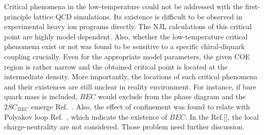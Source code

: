 \documentclass[prd, showpacs,nofootinbib,amsmath,amssymb,12pt]{revtex4}
\begin{document}
Critical phenomena in the low-temperature could not be addressed with the first-principle lattice QCD simulations.
Its existence is difficult to be observed in experimental heavy ion programs directly.
The NJL calculations of this critical point are highly model dependent.
Also, whether the low-temperature critical phenomena exist or not was found to be sensitive to a specific chiral-diquark coupling crucially\cite{}.
Even for the appropriate model parameters, the given COE region is rather narrow and the obtained critical point is located at the intermediate density\cite{abuki2010nambu}.
More importantly, the locations of such critical phenomena and their existences are still unclear in reality environment.
For instance, if bare quark mass is included, $BEC$ would exclude from the phase diagram and the $2SC_{BEC}$ emerge Ref.~\cite{basler2010role}.
Also, the effect of confinement was found to relate with Polyakov loop Ref.~\cite{Powell2011Axial}, which indicate the existence of $BEC$.
In the Ref.[], the local charge-neutrality are not considered.
Those problem need further discussion.
\end{document}
